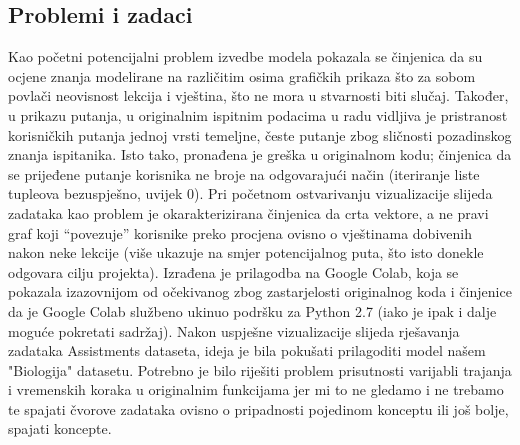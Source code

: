 \documentclass[times, utf8,projekt]{fer}
\begin{document}
\subsection{Problemi i zadaci}
Kao početni potencijalni problem izvedbe modela pokazala se činjenica da su ocjene znanja modelirane na različitim osima grafičkih prikaza što za sobom povlači neovisnost lekcija i vještina, što ne mora u stvarnosti biti slučaj. Također, u prikazu putanja, u originalnim ispitnim podacima u radu vidljiva je pristranost korisničkih putanja jednoj vrsti temeljne, česte putanje zbog sličnosti pozadinskog znanja ispitanika.\newline
Isto tako, pronađena je greška u originalnom kodu; činjenica da se prijeđene putanje korisnika ne broje na odgovarajući način (iteriranje liste tupleova bezuspješno, uvijek 0).\newline
Pri početnom ostvarivanju vizualizacije slijeda zadataka kao problem je okarakterizirana činjenica da crta vektore, a ne pravi graf koji “povezuje” korisnike preko procjena ovisno o vještinama dobivenih nakon neke lekcije (više ukazuje na smjer potencijalnog puta, što isto donekle odgovara cilju projekta).\newline 
Izrađena je prilagodba na Google Colab, koja se pokazala izazovnijom od očekivanog zbog zastarjelosti originalnog koda i činjenice da je Google Colab službeno ukinuo podršku za Python 2.7 (iako je ipak i dalje moguće pokretati sadržaj).\newline
Nakon uspješne vizualizacije slijeda rješavanja zadataka Assistments dataseta, ideja je bila pokušati prilagoditi model našem "Biologija" datasetu. Potrebno je bilo riješiti problem prisutnosti varijabli trajanja i vremenskih koraka u originalnim funkcijama jer mi to ne gledamo i ne trebamo te spajati čvorove zadataka ovisno o pripadnosti pojedinom konceptu ili još bolje, spajati koncepte. 
\end{document}
